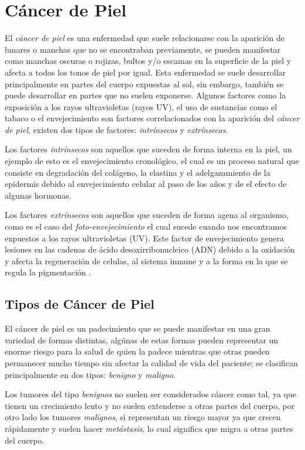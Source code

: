 \section{Cáncer de Piel}
El \emph{cáncer de piel} es una enfermedad que suele relacionarse con la aparición de lunares o manchas que no se encontraban previamente, se pueden manifestar como manchas oscuras o rojizas, bultos y/o escamas en la superficie de la piel y afecta a todos los tonos de piel por igual. Esta enfermedad se suele desarrollar principalmente en partes del cuerpo expuestas al sol, sin embargo, también se puede desarrollar en partes que no suelen exponerse. Algunos factores como la exposición a los rayos ultravioletas (rayos UV), el uso de sustancias como el tabaco o el envejecimiento son factores correlacionados con la aparición del \emph{cáncer de piel}, existen dos tipos de factores: \emph{intrínsecos} y \emph{extrínsecos}.

Los factores \emph{intrínsecos} son aquellos que suceden de forma interna en la piel, un ejemplo de esto es el envejecimiento cronológico, el cual es un proceso natural que consiste en degradación del colágeno, la elastina y el adelgazamiento de la epidermis debido al envejecimiento celular al paso de los años y de el efecto de algunas hormonas.
\bigskip

Los factores \emph{extrínsecos} son aquellos que suceden de forma agena al organismo, como es el caso del \emph{foto-envejecimiento} el cual sucede cuando nos encontramos expuestos a los rayos ultravioletas (UV). Este factor de envejecimiento genera lesiones en las cadenas de ácido desoxirribonucleico (ADN) debido a la oxidación y afecta la regeneración de celulas, al sistema inmune y a la forma en la que se regula la pigmentación \citep{skin_aging}.

\subsection{Tipos de Cáncer de Piel}
El cáncer de piel es un padecimiento que se puede manifestar en una gran variedad de formas distintas, algúnas de estas formas pueden representar un enorme riesgo para la salud de quien la padece mientras que otras pueden permanecer mucho tiempo sin afectar la calidad de vida del paciente; se clasifican principalmente en dos tipos: \emph{benigno} y \emph{maligno}.

Los tumores del tipo \emph{benignos} no suelen ser considerados cáncer como tal, ya que tienen un crecimiento lento y no suelen extenderse a otras partes del cuerpo, por otro lado los tumores \emph{malignos}, si representan un riesgo mayor ya que crecen rápidamente y suelen hacer \emph{metástasis}, lo cual significa que migra a otras partes del cuerpo.

